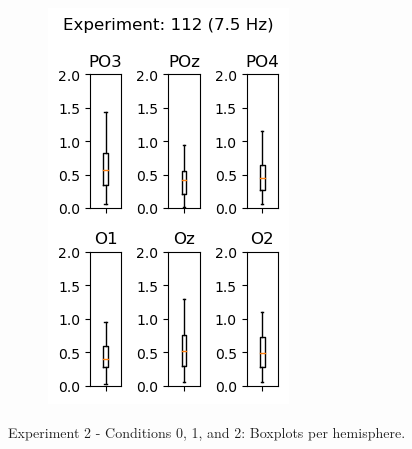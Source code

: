 \begin{figure}[ht]
\begin{subfigure}{0.25\linewidth}
        \includegraphics[width=\linewidth]{images/appendix/11275.png}
        \label{fig:11275}
    \end{subfigure}
    \caption{Experiment 2 - Conditions 0, 1, and 2: Boxplots per hemisphere.}
    \label{fig:2-6675}
\end{figure}

